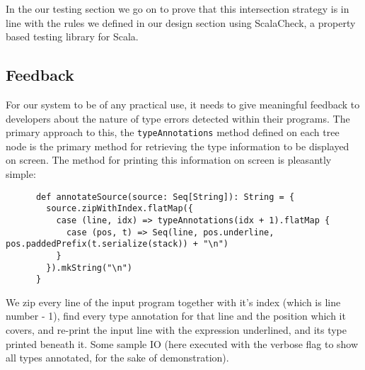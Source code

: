 \documentclass[british, twoside]{bhamthesis}
\theoremstyle{definition}
\begin{document}
      In the our testing section we go on to prove that this intersection strategy is in line with the rules we defined in our design section using ScalaCheck, a property based testing library for Scala.

      \subsection{Feedback}

      For our system to be of any practical use, it needs to give meaningful feedback to developers about the nature of type errors detected within their programs. The primary approach to this, the \texttt{typeAnnotations} method defined on each tree node is the primary method for retrieving the type information to be displayed on screen. The method for printing this information on screen is pleasantly simple:

      \begin{lstlisting}
      def annotateSource(source: Seq[String]): String = {
        source.zipWithIndex.flatMap({
          case (line, idx) => typeAnnotations(idx + 1).flatMap {
            case (pos, t) => Seq(line, pos.underline, pos.paddedPrefix(t.serialize(stack)) + "\n")
          }
        }).mkString("\n")
      }
      \end{lstlisting}

      We zip every line of the input program together with it's index (which is line number - 1), find every type annotation for that line and the position which it covers, and re-print the input line with the expression underlined, and its type printed beneath it. Some sample IO (here executed with the verbose flag to show all types annotated, for the sake of demonstration).
\end{document}
